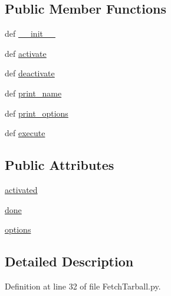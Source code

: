 \subsection*{Public Member Functions}
\begin{DoxyCompactItemize}
\item 
def \hyperlink{class_fetch_tarball_1_1_fetch_tarball_a0fb0f6decddbd019212beb941b1d8b33}{\-\_\-\-\_\-init\-\_\-\-\_\-}
\item 
def \hyperlink{class_fetch_tarball_1_1_fetch_tarball_a9a88f8be0e5f6c54247c3a85da711f38}{activate}
\item 
def \hyperlink{class_fetch_tarball_1_1_fetch_tarball_aba185f1c1adad0aea744fc418093ffcf}{deactivate}
\item 
def \hyperlink{class_fetch_tarball_1_1_fetch_tarball_afcac4e7b528550c345ffca891b0f32fa}{print\-\_\-name}
\item 
def \hyperlink{class_fetch_tarball_1_1_fetch_tarball_a750d4f069ce00c62d8e44d1e5dd47d08}{print\-\_\-options}
\item 
def \hyperlink{class_fetch_tarball_1_1_fetch_tarball_ad99192c36d2f7200799fa8a2a37c6a5a}{execute}
\end{DoxyCompactItemize}
\subsection*{Public Attributes}
\begin{DoxyCompactItemize}
\item 
\hyperlink{class_fetch_tarball_1_1_fetch_tarball_a4e6818fd64191913c3f302485c2c4e96}{activated}
\item 
\hyperlink{class_fetch_tarball_1_1_fetch_tarball_ae733fd553804854c3beef59df1739732}{done}
\item 
\hyperlink{class_fetch_tarball_1_1_fetch_tarball_ae5c7611a1ef415c3e38c75ea803ef2e3}{options}
\end{DoxyCompactItemize}


\subsection{Detailed Description}


Definition at line 32 of file Fetch\-Tarball.\-py.



